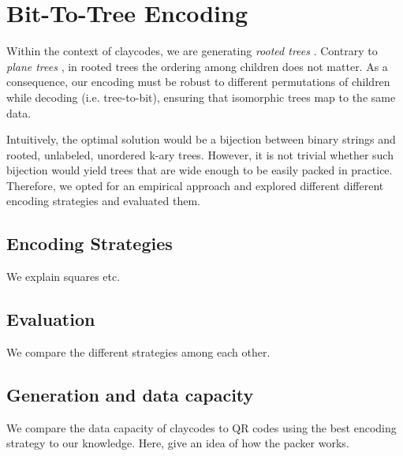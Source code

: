 \section{Bit-To-Tree Encoding}

Within the context of claycodes, we are generating \textit{rooted trees} \cite{NAKANORooted}. Contrary to \textit{plane trees} \cite{NAKANOPlane}, in rooted trees the ordering among children does not matter. As a consequence, our encoding must be robust to different permutations of children while decoding (i.e. tree-to-bit), ensuring that isomorphic trees map to the same data.

Intuitively, the optimal solution would be a bijection between binary strings and rooted, unlabeled, unordered k-ary trees. However, it is not trivial whether such bijection would yield trees that are wide enough to be easily packed in practice. Therefore, we opted for an empirical approach and explored different different encoding strategies and evaluated them.

\subsection[strategies]{Encoding Strategies}

We explain squares etc.

\subsection[encodingEval]{Evaluation}

We compare the different strategies among each other.

\subsection[generation]{Generation and data capacity}

We compare the data capacity of claycodes to QR codes using the best encoding strategy to our knowledge. Here, give an idea of how the packer works.